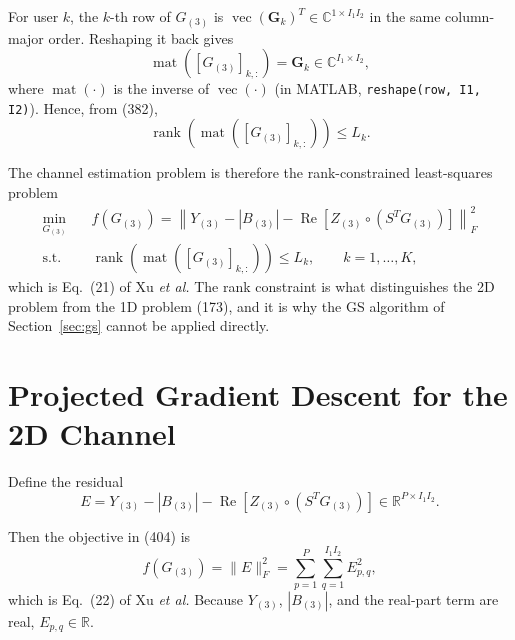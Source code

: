 \documentclass[12pt,a4paper]{article}
\begin{document}
For user $k$, the $k$-th row of $G_{(3)}$ is
$\operatorname{vec}(\mathbf G_k)^T\in\mathbb C^{1\times I_1I_2}$ in the same
column-major order. Reshaping it back gives
\begin{equation}
\operatorname{mat}\!\left([G_{(3)}]_{k,:}\right)
=\mathbf G_k
\in\mathbb C^{I_1\times I_2},
\tag{402}
\end{equation}
where $\operatorname{mat}(\cdot)$ is the inverse of $\operatorname{vec}(\cdot)$
(in MATLAB, \texttt{reshape(row, I1, I2)}). Hence, from (382),
\begin{equation}
\operatorname{rank}\!\left(
\operatorname{mat}\!\left([G_{(3)}]_{k,:}\right)
\right)\leq L_k.
\tag{403}
\end{equation}

The channel estimation problem is therefore the rank-constrained
least-squares problem
\begin{equation}
\boxed{
\begin{aligned}
\min_{G_{(3)}}\quad
&f(G_{(3)})
=\left\|
Y_{(3)}-|B_{(3)}|
-\operatorname{Re}\!\left[
Z_{(3)}\circ(S^TG_{(3)})
\right]
\right\|_F^2\\
\text{s.t.}\quad
&\operatorname{rank}\!\left(
\operatorname{mat}([G_{(3)}]_{k,:})
\right)\leq L_k,
\qquad k=1,\ldots,K,
\end{aligned}
}
\tag{404}
\end{equation}
which is Eq.~(21) of Xu \emph{et al.} The rank constraint is what
distinguishes the 2D problem from the 1D problem (173), and it is why
the GS algorithm of Section~\ref{sec:gs} cannot be applied
directly.

\section{Projected Gradient Descent for the 2D Channel}

Define the residual
\begin{equation}
\boxed{
E
=
Y_{(3)}-|B_{(3)}|
-\operatorname{Re}\!\left[
Z_{(3)}\circ(S^TG_{(3)})
\right]
\in\mathbb R^{P\times I_1I_2}.
}
\tag{405}
\end{equation}

Then the objective in (404) is
\begin{equation}
f(G_{(3)})
=\|E\|_F^2
=\sum_{p=1}^{P}\sum_{q=1}^{I_1I_2}E_{p,q}^2,
\tag{406}
\end{equation}
which is Eq.~(22) of Xu \emph{et al.} Because $Y_{(3)}$, $|B_{(3)}|$,
and the real-part term are real, $E_{p,q}\in\mathbb R$.
\end{document}
